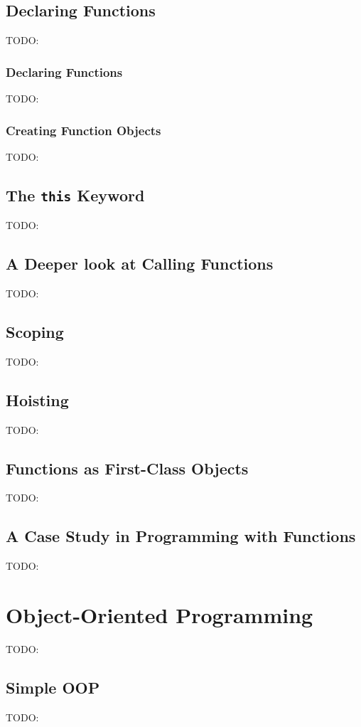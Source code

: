 \documentclass[11pt,letter]{book}
\begin{document}
    \section{Declaring Functions}
    TODO:
    
    \subsection{Declaring Functions}
    TODO:
    
    \subsection{Creating Function Objects}
    TODO:
    
    \section{The \texttt{this} Keyword}
    TODO:
    
    \section{A Deeper look at Calling Functions}
    TODO:
    
    \section{Scoping}
    TODO:
    
    \section{Hoisting}
    TODO:
    
    \section{Functions as First-Class Objects}
    TODO:
    
    \section{A Case Study in Programming with Functions}
    TODO:
    
    \chapter{Object-Oriented Programming}
    TODO:
    
    \section{Simple OOP}
    TODO:
    
\end{document}
